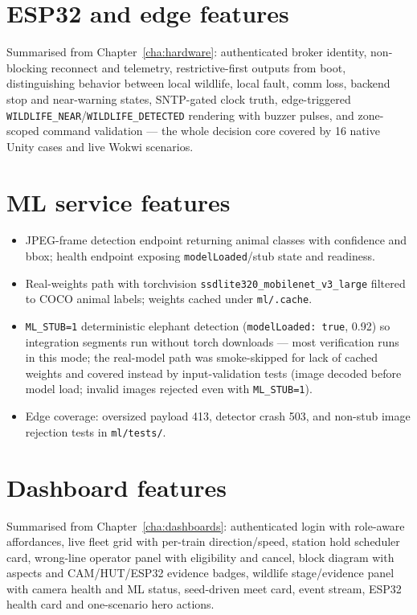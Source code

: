 \section{ESP32 and edge features}

Summarised from Chapter~\ref{cha:hardware}: authenticated broker identity,
non-blocking reconnect and telemetry, restrictive-first outputs from boot,
distinguishing behavior between local wildlife, local fault, comm loss,
backend stop and near-warning states, SNTP-gated clock truth, edge-triggered
\texttt{WILDLIFE\_NEAR}/\texttt{WILDLIFE\_DETECTED} rendering with buzzer
pulses, and zone-scoped command validation --- the whole decision core
covered by 16 native Unity cases and live Wokwi scenarios.

\section{ML service features}

\begin{itemize}
  \item JPEG-frame detection endpoint returning animal classes with
        confidence and bbox; health endpoint exposing
        \texttt{modelLoaded}/stub state and readiness.
  \item Real-weights path with torchvision
        \texttt{ssdlite320\_mobilenet\_v3\_large} filtered to COCO animal
        labels; weights cached under \texttt{ml/.cache}.
  \item \texttt{ML\_STUB=1} deterministic elephant detection
        (\texttt{modelLoaded: true}, 0.92) so integration segments run
        without torch downloads --- most verification runs in this mode;
        the real-model path was smoke-skipped for lack of cached weights
        and covered instead by input-validation tests (image decoded
        before model load; invalid images rejected even with
        \texttt{ML\_STUB=1}).
  \item Edge coverage: oversized payload 413, detector crash 503, and
        non-stub image rejection tests in \texttt{ml/tests/}.
\end{itemize}

\section{Dashboard features}

Summarised from Chapter~\ref{cha:dashboards}: authenticated login with
role-aware affordances, live fleet grid with per-train direction/speed,
station hold scheduler card, wrong-line operator panel with eligibility
and cancel, block diagram with aspects and CAM/HUT/ESP32 evidence badges,
wildlife stage/evidence panel with camera health and ML status, seed-driven
meet card, event stream, ESP32 health card and one-scenario hero actions.


